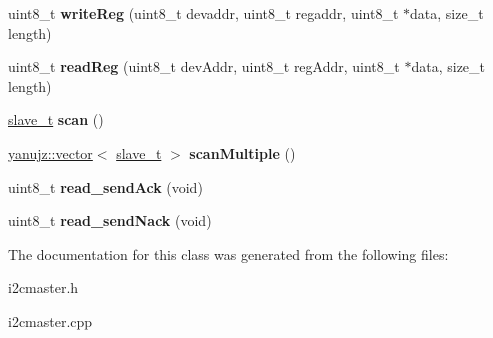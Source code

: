\begin{DoxyCompactItemize}
\item 
\mbox{\label{classI2CMaster_a8de7eba73af26425844c8e367278067b}} 
uint8\+\_\+t {\bfseries write\+Reg} (uint8\+\_\+t devaddr, uint8\+\_\+t regaddr, uint8\+\_\+t $\ast$data, size\+\_\+t length)
\item 
\mbox{\label{classI2CMaster_aabfbdaa651c8965928f2aee51a554a86}} 
uint8\+\_\+t {\bfseries read\+Reg} (uint8\+\_\+t dev\+Addr, uint8\+\_\+t reg\+Addr, uint8\+\_\+t $\ast$data, size\+\_\+t length)
\item 
\mbox{\label{classI2CMaster_a90399cf812db2fb854b3d198e2771797}} 
\mbox{\hyperlink{structslave__t}{slave\+\_\+t}} {\bfseries scan} ()
\item 
\mbox{\label{classI2CMaster_a9462113b6cf72724be7bbc92becc5f45}} 
\mbox{\hyperlink{classyanujz_1_1vector}{yanujz\+::vector}}$<$ \mbox{\hyperlink{structslave__t}{slave\+\_\+t}} $>$ {\bfseries scan\+Multiple} ()
\item 
\mbox{\label{classI2CMaster_a83ef1a0c9c1e4eaa046bc97afa281f1f}} 
uint8\+\_\+t {\bfseries read\+\_\+send\+Ack} (void)
\item 
\mbox{\label{classI2CMaster_a57d0a938061fa240f144ebf0981d7e77}} 
uint8\+\_\+t {\bfseries read\+\_\+send\+Nack} (void)
\end{DoxyCompactItemize}


The documentation for this class was generated from the following files\+:\begin{DoxyCompactItemize}
\item 
i2cmaster.\+h\item 
i2cmaster.\+cpp\end{DoxyCompactItemize}
